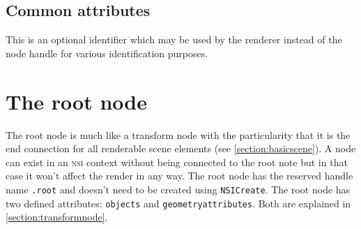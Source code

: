 \documentclass[oneside,ebook]{memoir}
\newcommand*{\acronym}[1]{\textsc{\lowercase{#1}}}
\newcommand{\paramlistitemTN}[2]{\item[#2\textcolor{lightgray}{\dotfill}#1]}
\begin{document}
\subsection*{Common attributes}
\begin{paramlist}
\paramlistitemTN{string}{nicename}
This is an optional identifier which may be used by the renderer instead of the node handle for various identification purposes.
\end{paramlist}

\section{The root node}
\label{section:rootnode}
The root node is much like a transform node with the particularity that it is the end connection for all renderable scene elements (see \autoref{section:basicscene}). A node can exist in an \acronym{NSI} context without being connected to the root note but in that case it won't affect the render in any way. The root node has the reserved handle name \lstinline|.root| and doesn't need to be created using \lstinline|NSICreate|. The root node has two defined attributes: \lstinline|objects| and \lstinline|geometryattributes|. Both are explained in \autoref{section:transformnode}.
\end{document}
